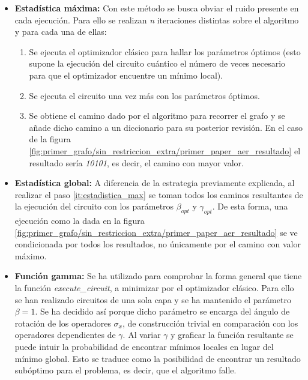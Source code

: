\documentclass{article}
\begin{document}
\begin{itemize}
\item \textbf{Estadística máxima:}
  Con este método se busca obviar el ruido presente en cada ejecución. Para ello se realizan \textit{n} iteraciones distintas sobre el algoritmo y para cada una de ellas:
  \begin{enumerate}
  \item
    Se ejecuta el optimizador clásico para hallar los parámetros óptimos (esto supone la ejecución del circuito cuántico el número de veces necesario para que el optimizador encuentre un mínimo local).
  \item
    Se ejecuta el circuito una vez más con los parámetros óptimos.
  \item \label{it:estadistica_max}
    Se obtiene el camino dado por el algoritmo para recorrer el grafo y se añade dicho camino a un diccionario para su posterior revisión. En el caso de la figura \ref{fig:primer_grafo/sin_restriccion_extra/primer_paper_aer_resultado}
    el resultado sería \textit{10101}, es decir, el camino con mayor valor.
  \end{enumerate}
  
\item \textbf{Estadística global:}
  A diferencia de la estrategia previamente explicada, al realizar el paso \ref{it:estadistica_max} se toman todos los caminos resultantes de la ejecución del circuito con los parámetros \(\beta_{opt}\) y \(\gamma_{opt}\).
  De esta forma, una ejecución como la dada en la figura \ref{fig:primer_grafo/sin_restriccion_extra/primer_paper_aer_resultado}
  se ve condicionada por todos los resultados, no únicamente por el camino con valor máximo.
  
\item \textbf{Función gamma:}
  Se ha utilizado para comprobar la forma general que tiene la función \textit{execute\_circuit}, a minimizar por el optimizador clásico. Para ello se han realizado circuitos de una sola capa y se ha mantenido el parámetro \(\beta=1\). Se ha decidido así porque dicho parámetro se encarga del ángulo de rotación de los operadores \(\sigma_{x}\), de construcción trivial en comparación con los operadores dependientes de \(\gamma\).
  Al variar \(\gamma\) y graficar la función resultante se puede intuir la probabilidad de encontrar mínimos locales en lugar del mínimo global. Esto se traduce como la posibilidad de encontrar un resultado subóptimo para el problema, es decir, que el algoritmo falle.
\end{itemize}
\end{document}
